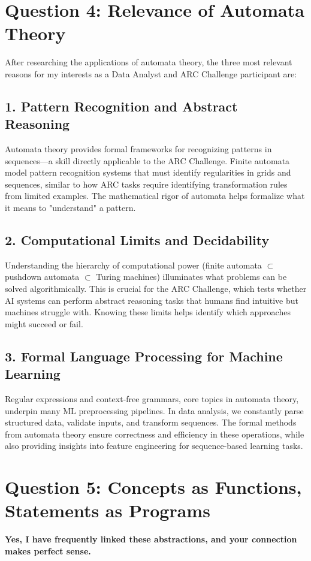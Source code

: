 \documentclass[12pt]{article}
\theoremstyle{definition}
\begin{document}
\section*{Question 4: Relevance of Automata Theory}
After researching the applications of automata theory, the three most relevant reasons for my interests as a Data Analyst and ARC Challenge participant are:

\subsection*{1. Pattern Recognition and Abstract Reasoning}
Automata theory provides formal frameworks for recognizing patterns in sequences—a skill directly applicable to the ARC Challenge. Finite automata model pattern recognition systems that must identify regularities in grids and sequences, similar to how ARC tasks require identifying transformation rules from limited examples. The mathematical rigor of automata helps formalize what it means to "understand" a pattern.

\subsection*{2. Computational Limits and Decidability}
Understanding the hierarchy of computational power (finite automata $\subset$ pushdown automata $\subset$ Turing machines) illuminates what problems can be solved algorithmically. This is crucial for the ARC Challenge, which tests whether AI systems can perform abstract reasoning tasks that humans find intuitive but machines struggle with. Knowing these limits helps identify which approaches might succeed or fail.

\subsection*{3. Formal Language Processing for Machine Learning}
Regular expressions and context-free grammars, core topics in automata theory, underpin many ML preprocessing pipelines. In data analysis, we constantly parse structured data, validate inputs, and transform sequences. The formal methods from automata theory ensure correctness and efficiency in these operations, while also providing insights into feature engineering for sequence-based learning tasks.

\section*{Question 5: Concepts as Functions, Statements as Programs}
\textbf{Yes, I have frequently linked these abstractions, and your connection makes perfect sense.}
\end{document}
